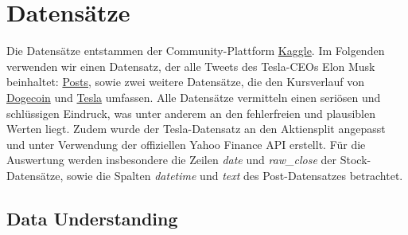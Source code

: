 \documentclass{article}
\begin{document}
\section{Datensätze} \label{Datensätze}
Die Datensätze entstammen der Community-Plattform \href{https://www.kaggle.com}{Kaggle}.
Im Folgenden verwenden wir einen Datensatz, der alle Tweets des Tesla-CEOs Elon Musk  beinhaltet: \href{https://www.kaggle.com/datasets/aryansingh0909/elon-musk-tweets-updated-daily}{Posts}, sowie zwei weitere Datensätze, die den Kursverlauf von \href{https://www.kaggle.com/datasets/dhruvildave/dogecoin-historical-data}{Dogecoin} und \href{https://www.kaggle.com/datasets/guillemservera/tsla-stock-data}{Tesla} umfassen.
Alle Datensätze vermitteln einen seriösen und schlüssigen Eindruck, was unter anderem an den fehlerfreien und plausiblen Werten liegt.
Zudem wurde der Tesla-Datensatz an den Aktiensplit angepasst und unter Verwendung der offiziellen Yahoo Finance API erstellt.
Für die Auswertung werden insbesondere die Zeilen \textit{date} und \textit{raw\_close} der Stock-Datensätze, sowie die Spalten \textit{datetime} und \textit{text} des Post-Datensatzes betrachtet.


\subsection{Data Understanding} \label{Data Understanding}
\end{document}
